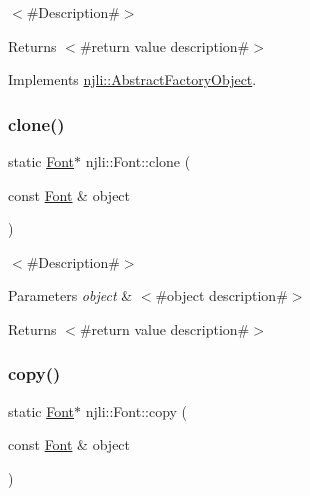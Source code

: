 $<$\#\+Description\#$>$

\begin{DoxyReturn}{Returns}
$<$\#return value description\#$>$ 
\end{DoxyReturn}


Implements \mbox{\hyperlink{classnjli_1_1_abstract_factory_object_a4763d05bc9dc37c559111f8bb30e1dd8}{njli\+::\+Abstract\+Factory\+Object}}.

\mbox{\label{classnjli_1_1_font_aecf1de07e7bf8f09b50876385042307b}} 
\subsubsection{\texorpdfstring{clone()}{clone()}}
{\footnotesize\ttfamily static \mbox{\hyperlink{classnjli_1_1_font}{Font}}$\ast$ njli\+::\+Font\+::clone (\begin{DoxyParamCaption}\item[{const \mbox{\hyperlink{classnjli_1_1_font}{Font}} \&}]{object }\end{DoxyParamCaption})\hspace{0.3cm}{\ttfamily [static]}}

$<$\#\+Description\#$>$


\begin{DoxyParams}{Parameters}
{\em object} & $<$\#object description\#$>$\\
\hline
\end{DoxyParams}
\begin{DoxyReturn}{Returns}
$<$\#return value description\#$>$ 
\end{DoxyReturn}
\mbox{\label{classnjli_1_1_font_a85aaa51dad67e045e6638b1db0356525}} 
\subsubsection{\texorpdfstring{copy()}{copy()}}
{\footnotesize\ttfamily static \mbox{\hyperlink{classnjli_1_1_font}{Font}}$\ast$ njli\+::\+Font\+::copy (\begin{DoxyParamCaption}\item[{const \mbox{\hyperlink{classnjli_1_1_font}{Font}} \&}]{object }\end{DoxyParamCaption})\hspace{0.3cm}{\ttfamily [static]}}

